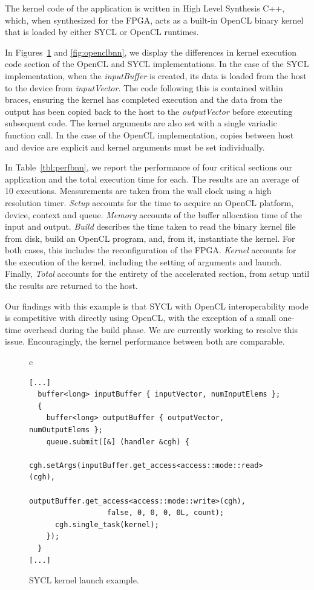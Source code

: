 \documentclass[sigplan]{acmart}
\begin{document}
The kernel code of the application is written in High Level Synthesis
C++, which, when synthesized for the FPGA, acts as a built-in OpenCL
binary kernel that is loaded by either SYCL or OpenCL runtimes.

In Figures~\ref{fig:syclbnn} and \ref{fig:openclbnn}, we display the differences in kernel execution code section of the OpenCL and SYCL implementations. In the case of the SYCL implementation, when the \textit{inputBuffer} is created, its data is loaded from the host to the device from \textit{inputVector}. The code following this is contained within braces, ensuring the kernel has completed execution and the data from the output has been copied back to the host to the \textit{outputVector} before executing subsequent code. The kernel arguments are also set with a single variadic function call. In the case of the OpenCL implementation, copies between host and device are explicit and kernel arguments must be set individually. 

In Table~\ref{tbl:perfbnn}, we report the performance of four critical sections our application and the total execution time for each. The results are an average of 10 executions. Measurements are taken from the wall clock using a high resolution timer. \textit{Setup} accounts for the time to acquire an OpenCL platform, device, context and queue. \textit{Memory} accounts of the buffer allocation time of the input and output. \textit{Build} describes the time taken to read the binary kernel file from disk, build an OpenCL program, and, from it, instantiate the kernel. For both cases, this includes the reconfiguration of the FPGA. \textit{Kernel} accounts for the execution of the kernel, including the setting of arguments and launch. Finally, \textit{Total} accounts for the entirety of the accelerated section, from setup until the results are returned to the host.


Our findings with this example is that SYCL with OpenCL interoperability mode is competitive with directly using OpenCL, with the exception of a small one-time overhead during the build phase. We are currently working to resolve this issue. Encouragingly, the kernel performance between both are comparable.

\begin{figure}
  \begin{tabular}{c}
    \begin{lstlisting}[basicstyle=\scriptsize]
[...]
  buffer<long> inputBuffer { inputVector, numInputElems };
  {
    buffer<long> outputBuffer { outputVector, numOutputElems };
    queue.submit([&] (handler &cgh) {
      cgh.setArgs(inputBuffer.get_access<access::mode::read>(cgh),
                  outputBuffer.get_access<access::mode::write>(cgh),
                  false, 0, 0, 0, 0L, count);
      cgh.single_task(kernel);
    });
  }
[...]
\end{lstlisting}
\end{tabular}
\caption{SYCL kernel launch example.}
\label{fig:syclbnn}
\end{figure}
\end{document}
